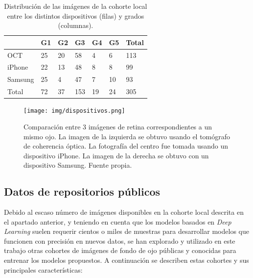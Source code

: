 \begin{table}[h]
\centering
\begin{tabular}{@{}llllll|l@{}}
\toprule
        & G1 & G2 & G3  & G4 & G5 & Total \\ \midrule
OCT     & 25 & 20 & 58  & 4  & 6  & 113   \\
iPhone  & 22 & 13 & 48  & 8  & 8  & 99    \\
Samsung & 25 & 4  & 47  & 7  & 10 & 93    \\ \midrule
Total   & 72 & 37 & 153 & 19 & 24 & 305   \\ \bottomrule
\end{tabular}
\caption{Distribución de las imágenes de la cohorte local entre los distintos dispositivos (filas) y grados (columnas).}
\label{tab:cohorte}
\end{table}

\begin{figure}[h]
    \centering
    \texttt{[image: img/dispositivos.png]}
    \caption{Comparación entre 3 imágenes de retina correspondientes a un mismo ojo. La imagen de la izquierda se obtuvo usando el tomógrafo de coherencia óptica. La fotografía del centro fue tomada usando un dispositivo iPhone. La imagen de la derecha se obtuvo con un dispositivo Samsung. Fuente propia.}
    \label{fig:comp_dispositivos}
\end{figure}

\subsection{Datos de repositorios públicos}

Debido al escaso número de imágenes disponibles en la cohorte local descrita en el apartado anterior, y teniendo en cuenta que los modelos basados en \textit{Deep Learning} suelen requerir cientos o miles de muestras para desarrollar modelos que funcionen con precisión en nuevos datos, se han explorado y utilizado en este trabajo otras cohortes de imágenes de fondo de ojo públicas y conocidas para entrenar los modelos propuestos. A continuación se describen estas cohortes y sus principales características:

